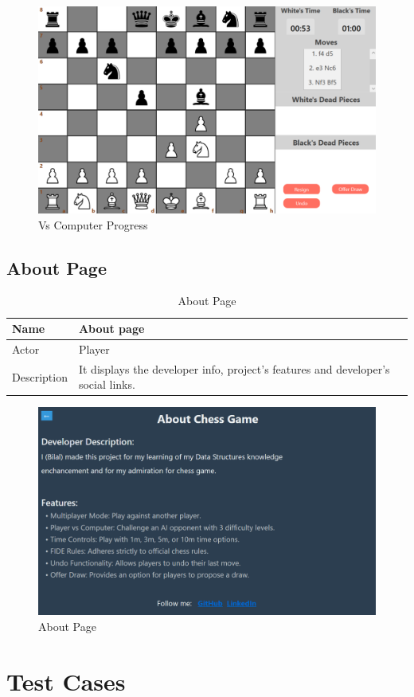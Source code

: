 \documentclass[a4paper,12pt]{article}
\begin{document}
\begin{figure}[H]
    \centering
    \includegraphics[width=0.7\linewidth]{Images/Use Cases/vsComputerProgress.png}
    \caption{Vs Computer Progress}
    \label{fig:vsComputerProgress}
\end{figure}
    
\subsection{About Page}

\begin{longtable}{|m{}|m{}|}
    \caption{About Page} \\
    \hline
    Name & About page \\
    \hline
    Actor & Player \\
    \hline
    Description & It displays the developer info, project's features and developer's social links. \\ 
    \hline
\end{longtable}

\begin{figure}[H]
    \centering
    \includegraphics[width=0.7\linewidth]{Images/Use Cases/aboutPage.png}
    \caption{About Page}
    \label{fig:aboutPage}
\end{figure}
    
\section{Test Cases}
\end{document}
